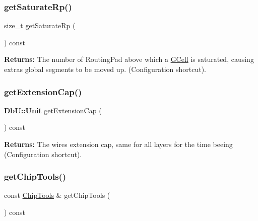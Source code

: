 \subsubsection{\texorpdfstring{get\+Saturate\+Rp()}{getSaturateRp()}}
{\footnotesize\ttfamily size\+\_\+t get\+Saturate\+Rp (\begin{DoxyParamCaption}{ }\end{DoxyParamCaption}) const\hspace{0.3cm}{\ttfamily [inline]}}

{\bfseries Returns\+:} The number of Routing\+Pad above which a \hyperlink{classKatabatic_1_1GCell}{G\+Cell} is saturated, causing extras global segments to be moved up. (Configuration shortcut). \mbox{\label{classKatabatic_1_1KatabaticEngine_ad9072cfa6215c92c9a9842270cf677c5}} 
\subsubsection{\texorpdfstring{get\+Extension\+Cap()}{getExtensionCap()}}
{\footnotesize\ttfamily \textbf{ Db\+U\+::\+Unit} get\+Extension\+Cap (\begin{DoxyParamCaption}{ }\end{DoxyParamCaption}) const\hspace{0.3cm}{\ttfamily [inline]}}

{\bfseries Returns\+:} The wires extension cap, same for all layers for the time beeing (Configuration shortcut). \mbox{\label{classKatabatic_1_1KatabaticEngine_a423f5f2214c8b9fe73da9a86b6f6d9b9}} 
\subsubsection{\texorpdfstring{get\+Chip\+Tools()}{getChipTools()}}
{\footnotesize\ttfamily const \hyperlink{classKatabatic_1_1ChipTools}{Chip\+Tools} \& get\+Chip\+Tools (\begin{DoxyParamCaption}{ }\end{DoxyParamCaption}) const\hspace{0.3cm}{\ttfamily [inline]}}

